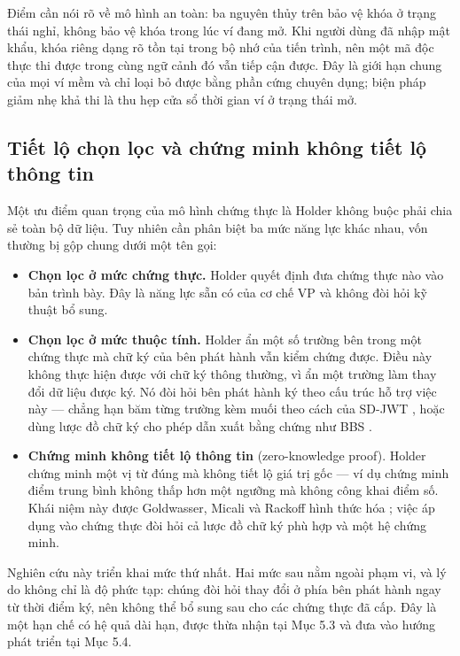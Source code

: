 Điểm cần nói rõ về mô hình an toàn: ba nguyên thủy trên bảo vệ khóa ở trạng thái nghỉ, không bảo vệ khóa trong lúc ví đang mở. Khi người dùng đã nhập mật khẩu, khóa riêng dạng rõ tồn tại trong bộ nhớ của tiến trình, nên một mã độc thực thi được trong cùng ngữ cảnh đó vẫn tiếp cận được. Đây là giới hạn chung của mọi ví mềm và chỉ loại bỏ được bằng phần cứng chuyên dụng; biện pháp giảm nhẹ khả thi là thu hẹp cửa sổ thời gian ví ở trạng thái mở.

\subsection{Tiết lộ chọn lọc và chứng minh không tiết lộ thông tin}

Một ưu điểm quan trọng của mô hình chứng thực là Holder không buộc phải chia sẻ toàn bộ dữ liệu. Tuy nhiên cần phân biệt ba mức năng lực khác nhau, vốn thường bị gộp chung dưới một tên gọi:

\begin{itemize}
    \item \textbf{Chọn lọc ở mức chứng thực.} Holder quyết định đưa chứng thực nào vào bản trình bày. Đây là năng lực sẵn có của cơ chế VP và không đòi hỏi kỹ thuật bổ sung.
    \item \textbf{Chọn lọc ở mức thuộc tính.} Holder ẩn một số trường bên trong một chứng thực mà chữ ký của bên phát hành vẫn kiểm chứng được. Điều này không thực hiện được với chữ ký thông thường, vì ẩn một trường làm thay đổi dữ liệu được ký. Nó đòi hỏi bên phát hành ký theo cấu trúc hỗ trợ việc này --- chẳng hạn băm từng trường kèm muối theo cách của SD-JWT \cite{RFC9901}, hoặc dùng lược đồ chữ ký cho phép dẫn xuất bằng chứng như BBS \cite{Looker_BBS2025}.
    \item \textbf{Chứng minh không tiết lộ thông tin} (zero-knowledge proof). Holder chứng minh một vị từ đúng mà không tiết lộ giá trị gốc --- ví dụ chứng minh điểm trung bình không thấp hơn một ngưỡng mà không công khai điểm số. Khái niệm này được Goldwasser, Micali và Rackoff hình thức hóa \cite{Goldwasser1989}; việc áp dụng vào chứng thực đòi hỏi cả lược đồ chữ ký phù hợp và một hệ chứng minh.
\end{itemize}

Nghiên cứu này triển khai mức thứ nhất. Hai mức sau nằm ngoài phạm vi, và lý do không chỉ là độ phức tạp: chúng đòi hỏi thay đổi ở phía bên phát hành ngay từ thời điểm ký, nên không thể bổ sung sau cho các chứng thực đã cấp. Đây là một hạn chế có hệ quả dài hạn, được thừa nhận tại Mục 5.3 và đưa vào hướng phát triển tại Mục 5.4.

